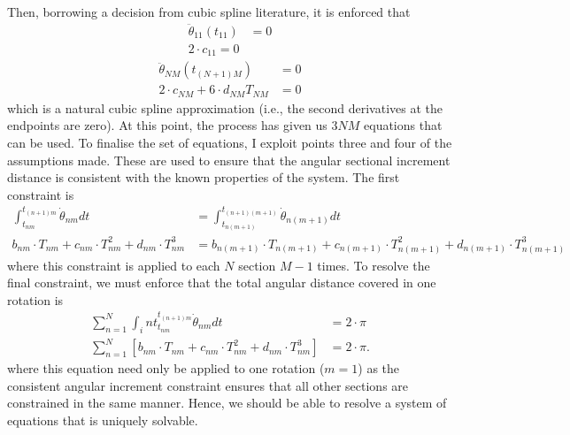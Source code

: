 \documentclass{article}
\begin{document}
	
	Then, borrowing a decision from cubic spline literature, it is enforced that
	\begin{equation}
		\begin{aligned}
			\ddot{\theta}_{11}(t_{11}) &= 0 \\
			2 \cdot c_{11}  = 0
		\end{aligned}
	\end{equation}
	\begin{equation}
		\begin{aligned}
			\ddot{\theta}_{NM}(t_{(N + 1)M}) &= 0 \\
			2 \cdot c_{NM} + 6 \cdot d_{NM} T_{NM} &= 0
		\end{aligned}
	\end{equation}
	which is a natural cubic spline approximation (i.e., the second derivatives at the endpoints are zero). At this point, the process has given us $3NM$ equations that can be used. To finalise the set of equations, I exploit points three and four of the assumptions made. These are used to ensure that the angular sectional increment distance is consistent with the known properties of the system. The first constraint is
	\begin{equation}
		\begin{aligned}
			\int_{t_{nm}}^{t_{(n+1)m}} \dot{\theta}_{nm}dt &= \int_{t_{n(m + 1)}}^{t_{(n+1)(m + 1)}} \dot{\theta}_{n(m + 1)}dt \\
			b_{nm} \cdot T_{nm} + c_{nm} \cdot T_{nm}^2 + d_{nm} \cdot T_{nm}^3 &= b_{n(m+1)} \cdot T_{n(m+1)} + c_{n(m+1)} \cdot T_{n(m+1)}^2 + d_{n(m+1)} \cdot T_{n(m+1)}^3
		\end{aligned}
	\end{equation} 
	where this constraint is applied to each $N$ section $M-1$ times. To resolve the final constraint, we must enforce that the total angular distance covered in one rotation is 
	\begin{equation}
		\begin{aligned}
		\sum_{n=1}^{N} \int_int_{t_{nm}}^{t_{(n+1)m}} \dot{\theta}_{nm}dt &= 2 \cdot \pi \\
		\sum_{n=1}^{N} \left[ b_{nm} \cdot T_{nm} + c_{nm} \cdot T_{nm}^2 + d_{nm} \cdot T_{nm}^3 \right] &= 2 \cdot \pi.
		\end{aligned}
	\end{equation}
	where this equation need only be applied to one rotation ($m = 1$) as the consistent angular increment constraint ensures that all other sections are constrained in the same manner. Hence, we should be able to resolve a system of equations that is uniquely solvable.
	
\end{document}
